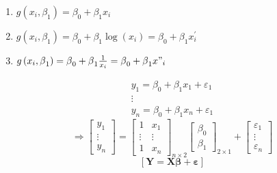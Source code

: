 \documentclass{article}
\begin{document}
\begin{enumerate}
\item $g\left( x_{i},\beta _{1}\right) =\beta _{0}+\beta _{1}x_{i}$

\item $g\left( x_{i},\beta _{1}\right) =\beta _{0}+\beta _{1}\log \left(
x_{i}\right) =\beta _{0}+\beta _{1}x_{i}^{\prime }$

\item $g\left( x_{i},\beta _{1}\right) =\beta _{0}+\beta _{1}\frac{1}{x_{i}}%
=\beta _{0}+\beta _{1}x"_{i}$
\end{enumerate}

\begin{equation*}
\begin{array}{c}
y_{1}=\beta _{0}+\beta _{1}x_{1}+\varepsilon _{1} \\ 
\vdots  \\ 
y_{n}=\beta _{0}+\beta _{1}x_{n}+\varepsilon _{1}%
\end{array}%
\end{equation*}%
\begin{equation*}
\Rightarrow \left[ 
\begin{array}{c}
y_{1} \\ 
\vdots  \\ 
y_{n}%
\end{array}%
\right] =\left[ 
\begin{array}{cc}
1 & x_{1} \\ 
\vdots  & \vdots  \\ 
1 & x_{n}%
\end{array}%
\right] _{n\times 2}\left[ 
\begin{array}{c}
\beta _{0} \\ 
\beta _{1}%
\end{array}%
\right] _{2\times 1}+\left[ 
\begin{array}{c}
\varepsilon _{1} \\ 
\vdots  \\ 
\varepsilon _{n}%
\end{array}%
\right] 
\end{equation*}%
\begin{equation*}
\left[ \mathbf{Y=X\beta +\varepsilon }\right] 
\end{equation*}
\end{document}

